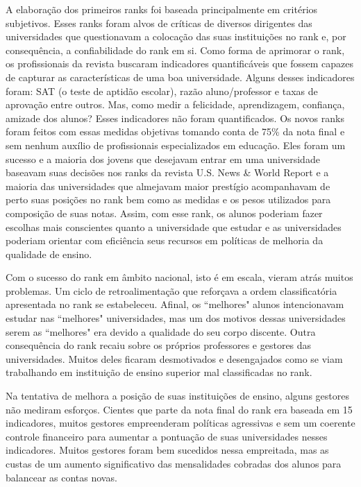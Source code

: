 \documentclass{article}
\begin{document}
A elaboração dos primeiros ranks foi baseada principalmente em critérios subjetivos. Esses ranks foram alvos de críticas de diversos dirigentes das universidades que questionavam a colocação das suas instituições no rank e, por consequência, a confiabilidade do rank em si. Como forma de aprimorar o rank, os profissionais da revista buscaram indicadores quantificáveis que fossem capazes de capturar as características de uma boa universidade. Alguns desses indicadores foram: SAT (o teste de aptidão escolar), razão aluno/professor e taxas de aprovação entre outros. Mas, como medir a felicidade, aprendizagem, confiança, amizade dos alunos? Esses indicadores não foram quantificados. Os novos ranks foram feitos com essas medidas objetivas tomando conta de 75\% da nota final e sem nenhum auxílio de profissionais especializados em educação. Eles foram um sucesso e a maioria dos jovens que desejavam entrar em uma universidade baseavam suas decisões nos ranks da revista U.S. News \& World Report e a maioria das universidades que  almejavam maior prestígio acompanhavam de perto suas posições no rank bem como as medidas e os pesos utilizados para composição de suas notas. Assim, com esse rank, os alunos poderiam fazer escolhas mais conscientes quanto a universidade que estudar e as universidades poderiam orientar com eficiência seus recursos em políticas de melhoria da qualidade de ensino.

Com o sucesso do rank em âmbito nacional, isto é em escala, vieram atrás muitos problemas. Um ciclo de retroalimentação que reforçava a ordem classificatória apresentada no rank se estabeleceu. Afinal, os ``melhores" alunos intencionavam estudar nas ``melhores" universidades, mas um dos motivos dessas universidades serem as ``melhores" era devido a qualidade do seu corpo discente. Outra consequência do rank recaiu sobre os próprios professores e gestores das universidades. Muitos deles ficaram desmotivados e desengajados como se viam trabalhando em instituição de ensino superior mal classificadas no rank.

Na tentativa de melhora a posição de suas instituições de ensino, alguns gestores não mediram esforços. Cientes que parte da nota final do rank era baseada em 15 indicadores, muitos gestores empreenderam políticas agressivas e sem um coerente controle financeiro para aumentar a pontuação de suas universidades nesses indicadores. Muitos gestores foram bem sucedidos nessa empreitada, mas as custas de um aumento significativo das mensalidades cobradas dos alunos para balancear as contas novas.
\end{document}
